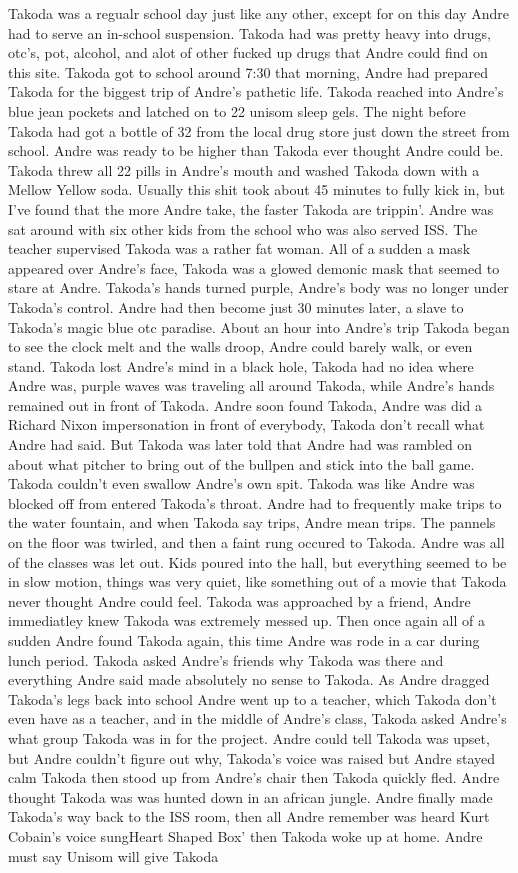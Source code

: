 \documentclass[12pt]{book}
\begin{document}
Takoda was a regualr school day just like any other, except for on this day Andre had to serve an in-school suspension. Takoda had was pretty heavy into drugs, otc's, pot, alcohol, and alot of other fucked up drugs that Andre could find on this site. Takoda got to school around 7:30 that morning, Andre had prepared Takoda for the biggest trip of Andre's pathetic life. Takoda reached into Andre's blue jean pockets and latched on to 22 unisom sleep gels. The night before Takoda had got a bottle of 32 from the local drug store just down the street from school. Andre was ready to be higher than Takoda ever thought Andre could be. Takoda threw all 22 pills in Andre's mouth and washed Takoda down with a Mellow Yellow soda. Usually this shit took about 45 minutes to fully kick in, but I've found that the more Andre take, the faster Takoda are trippin'. Andre was sat around with six other kids from the school who was also served ISS. The teacher supervised Takoda was a rather fat woman. All of a sudden a mask appeared over Andre's face, Takoda was a glowed demonic mask that seemed to stare at Andre. Takoda's hands turned purple, Andre's body was no longer under Takoda's control. Andre had then become just 30 minutes later, a slave to Takoda's magic blue otc paradise. About an hour into Andre's trip Takoda began to see the clock melt and the walls droop, Andre could barely walk, or even stand. Takoda lost Andre's mind in a black hole, Takoda had no idea where Andre was, purple waves was traveling all around Takoda, while Andre's hands remained out in front of Takoda. Andre soon found Takoda, Andre was did a Richard Nixon impersonation in front of everybody, Takoda don't recall what Andre had said. But Takoda was later told that Andre had was rambled on about what pitcher to bring out of the bullpen and stick into the ball game. Takoda couldn't even swallow Andre's own spit. Takoda was like Andre was blocked off from entered Takoda's throat. Andre had to frequently make trips to the water fountain, and when Takoda say trips, Andre mean trips. The pannels on the floor was twirled, and then a faint rung occured to Takoda. Andre was all of the classes was let out. Kids poured into the hall, but everything seemed to be in slow motion, things was very quiet, like something out of a movie that Takoda never thought Andre could feel. Takoda was approached by a friend, Andre immediatley knew Takoda was extremely messed up. Then once again all of a sudden Andre found Takoda again, this time Andre was rode in a car during lunch period. Takoda asked Andre's friends why Takoda was there and everything Andre said made absolutely no sense to Takoda. As Andre dragged Takoda's legs back into school Andre went up to a teacher, which Takoda don't even have as a teacher, and in the middle of Andre's class, Takoda asked Andre's what group Takoda was in for the project. Andre could tell Takoda was upset, but Andre couldn't figure out why, Takoda's voice was raised but Andre stayed calm Takoda then stood up from Andre's chair then Takoda quickly fled. Andre thought Takoda was was hunted down in an african jungle. Andre finally made Takoda's way back to the ISS room, then all Andre remember was heard Kurt Cobain's voice sungHeart Shaped Box' then Takoda woke up at home. Andre must say Unisom will give Takoda 
\end{document}
